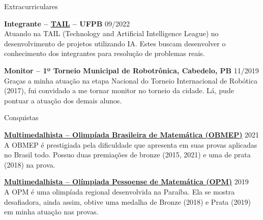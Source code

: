 \documentclass{resume} %
\begin{document}
\begin{rSection}{Extracurriculares} \itemsep -1pt {}

\item \textbf{Integrante – \href{https://www.instagram.com/tailufpb/}{TAIL} – UFPB} \hfill 09/2022 \\
Atuando na TAIL (Technology and Artificial Intelligence League) no desenvolvimento de projetos utilizando IA. Estes buscam desenvolver o conhecimento dos integrantes para resolução de problemas reais.

\item \textbf{Monitor – 1º Torneio Municipal de Robotrônica, Cabedelo, PB} \hfill 11/2019 \\
Graças a minha atuação na etapa Nacional do Torneio Internacional de Robótica (2017), fui convidado a me tornar monitor no torneio da cidade. Lá, pude pontuar a atuação dos demais alunos. 
\end{rSection}


\begin{rSection}{Conquistas}

\item \textbf{\href{http://www.obmep.org.br/}{Multimedalhista – Olimpíada Brasileira de Matemática (OBMEP)}} \hfill 2021 \\
A OBMEP é prestigiada pela dificuldade que apresenta em suas provas aplicadas no Brasil todo. Possuo duas premiações de bronze (2015, 2021) e uma de prata (2018) na prova.

\item \textbf{\href{http://www.mat.ufpb.br/opm/}{Multimedalhista – Olímpiada Pessoense de Matemática (OPM)}} \hfill 2019 \\
A OPM é uma olimpíada regional desenvolvida na Paraíba. Ela se mostra desafiadora, ainda assim, obtive uma medalha de Bronze (2018) e Prata (2019) em minha atuação nas provas.

\end{rSection}
\end{document}
